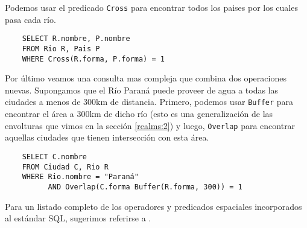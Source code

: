 Podemos usar el predicado \texttt{Cross} para encontrar todos los paises por los cuales pasa cada río.

\begin{verbatim}
    SELECT R.nombre, P.nombre
    FROM Rio R, Pais P
    WHERE Cross(R.forma, P.forma) = 1
\end{verbatim}

Por último veamos una consulta mas compleja que combina dos operaciones nuevas. Supongamos que el Río Paraná puede proveer de agua a todas las ciudades a menos de 300km de distancia. Primero, podemos usar \texttt{Buffer} para encontrar el área a 300km de dicho río (esto es una generalización de las envolturas que vimos en la sección \ref{realms:2}) y luego, \texttt{Overlap} para encontrar aquellas ciudades que tienen intersección con esta área.

\begin{verbatim}
    SELECT C.nombre
    FROM Ciudad C, Rio R
    WHERE Rio.nombre = "Paraná"
          AND Overlap(C.forma Buffer(R.forma, 300)) = 1
\end{verbatim}

Para un listado completo de los operadores y predicados espaciales incorporados al estándar SQL, sugerimos referirse a \cite{99opengis}.




